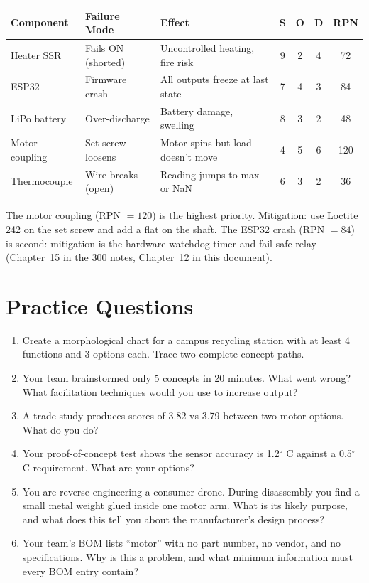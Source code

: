 \begin{greenshieldbox}
\begin{tabularx}{\linewidth}{X X X c c c c}
\toprule
\textbf{Component} & \textbf{Failure Mode} & \textbf{Effect} & \textbf{S} & \textbf{O} & \textbf{D} & \textbf{RPN} \\
\midrule
Heater SSR & Fails ON (shorted) & Uncontrolled heating, fire risk & 9 & 2 & 4 & 72 \\
ESP32 & Firmware crash & All outputs freeze at last state & 7 & 4 & 3 & 84 \\
LiPo battery & Over-discharge & Battery damage, swelling & 8 & 3 & 2 & 48 \\
Motor coupling & Set screw loosens & Motor spins but load doesn't move & 4 & 5 & 6 & 120 \\
Thermocouple & Wire breaks (open) & Reading jumps to max or NaN & 6 & 3 & 2 & 36 \\
\bottomrule
\end{tabularx}
\vspace{0.3em}
The motor coupling (RPN $= 120$) is the highest priority. Mitigation: use Loctite 242 on the set screw and add a flat on the shaft. The ESP32 crash (RPN $= 84$) is second: mitigation is the hardware watchdog timer and fail-safe relay (Chapter~15 in the 300 notes, Chapter~12 in this document).
\end{greenshieldbox}
\section{Practice Questions}
\begin{enumerate}[leftmargin=1.5em]
\item Create a morphological chart for a campus recycling station with at least 4 functions and 3 options each. Trace two complete concept paths.
\item Your team brainstormed only 5 concepts in 20 minutes. What went wrong? What facilitation techniques would you use to increase output?
\item A trade study produces scores of 3.82 vs 3.79 between two motor options. What do you do?
\item Your proof-of-concept test shows the sensor accuracy is 1.2$^{\circ}$ C against a 0.5$^{\circ}$ C requirement. What are your options?
\item You are reverse-engineering a consumer drone. During disassembly you find a small metal weight glued inside one motor arm. What is its likely purpose, and what does this tell you about the manufacturer's design process?
\item Your team's BOM lists ``motor'' with no part number, no vendor, and no specifications. Why is this a problem, and what minimum information must every BOM entry contain?
\end{enumerate}

